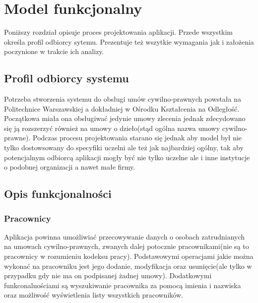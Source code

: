 \chapter{Model funkcjonalny}
Poniższy rozdział opisuje proces projektowania aplikacji. Przede wszystkim określa profil odbiorcy sytemu. Prezentuje też wszytkie wymagania jak i założenia poczynione w trakcie ich analizy.

\section[Profil odbiorcy systemu][Profil odbiorcy systemu]{Profil odbiorcy systemu}
Potrzeba stworzenia systemu do obsługi umów cywilno-prawnych powstała na Politechnice Warszawskiej a dokładniej w Ośrodku Kształcenia na Odległość. Początkowa miała ona obsługiwać jedynie umowy zlecenia jednak zdecydowano się ją rozszerzyć również na umowy o dzieło(stąd ogólna nazwa umowy cywilno-prawne). Podczas procesu projektowania starano się jednak aby model był nie tylko dostowsowany do specyfiki uczelni ale też jak najbardziej ogólny, tak aby potencjalnym odbiorcą aplikacji mogły być nie tylko uczelne ale i inne instytucje o podobnej organizacji a nawet małe firmy.

\section[Opis funkcjonalności][Opis funkcjonalności]{Opis funkcjonalności}

\subsection[Pracownicy][Pracownicy]{Pracownicy}
Aplikacja powinna umożliwiać przecowywanie danych o osobach zatrudnianych na umowach cywilno-prawnych, zwanych dalej potocznie pracownikami(nie są to pracownicy w rozumieniu kodeksu pracy). Podstawowymi operacjami jakie można wykonać na pracowniku jest jego dodanie, modyfikacja oraz usunięcie(ale tylko w przypadku gdy nie ma on podpisanej żadnej umowy). Dodatkowymi funkconalnościami są wyszukiwanie pracownika za pomocą imienia i nazwiska oraz możliwość wyświetlenia listy wszystkich pracowników.

